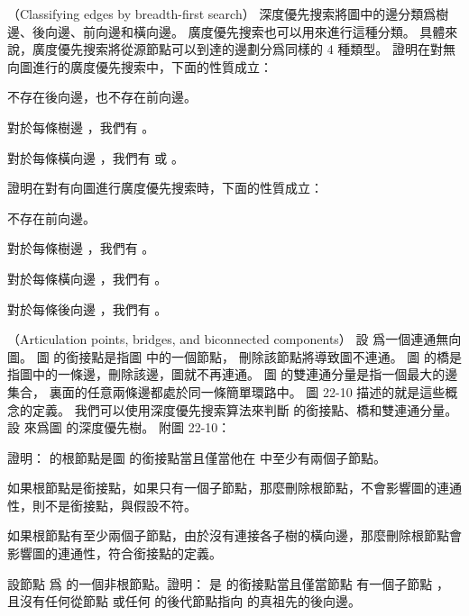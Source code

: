 \startsubject[
  title={Problems},
]

\startPROBLEM
（Classifying edges by breadth-first search）
深度優先搜索將圖中的邊分類爲樹邊、後向邊、前向邊和橫向邊。
廣度優先搜索也可以用來進行這種分類。
具體來說，廣度優先搜索將從源節點可以到達的邊劃分爲同樣的 4 種類型。
\startigBase[a]
\startitem
證明在對無向圖進行的廣度優先搜索中，下面的性質成立：
\startigBase[n]
\item 不存在後向邊，也不存在前向邊。
\item 對於每條樹邊 ，我們有 。
\item 對於每條橫向邊 ，我們有  或 。
\stopigBase
\stopitem

\startANSWER
{}
\stopANSWER

\startitem
證明在對有向圖進行廣度優先搜索時，下面的性質成立：
\startigBase[n]
\item 不存在前向邊。
\item 對於每條樹邊 ，我們有 。
\item 對於每條橫向邊 ，我們有 。
\item 對於每條後向邊 ，我們有 。
\stopigBase
\stopitem

\startANSWER
{}
\stopANSWER

\stopigBase
\stopPROBLEM

\startPROBLEM
（Articulation points, bridges, and biconnected components）
設  爲一個連通無向圖。
圖  的{\EMP 銜接點}是指圖  中的一個節點，
刪除該節點將導致圖不連通。
圖  的{\EMP 橋}是指圖中的一條邊，刪除該邊，圖就不再連通。
圖  的{\EMP 雙連通分量}是指一個最大的邊集合，
裏面的任意兩條邊都處於同一條簡單環路中。
圖 22-10 描述的就是這些概念的定義。
我們可以使用深度優先搜索算法來判斷  的銜接點、橋和雙連通分量。
設  來爲圖  的深度優先樹。
附圖 22-10：

\externalfigure[output/p22-2-1]

\startigBase[a]\startitem
證明：  的根節點是圖  的銜接點當且僅當他在  中至少有兩個子節點。
\stopitem\stopigBase

\startANSWER
如果根節點是銜接點，如果只有一個子節點，那麼刪除根節點，不會影響圖的連通性，則不是銜接點，與假設不符。

如果根節點有至少兩個子節點，由於沒有連接各子樹的橫向邊，那麼刪除根節點會影響圖的連通性，符合銜接點的定義。
\stopANSWER

\startigBase[continue]\startitem
設節點  爲  的一個非根節點。證明：
  是  的銜接點當且僅當節點  有一個子節點 ，
且沒有任何從節點  或任何  的後代節點指向  的真祖先的後向邊。
\stopitem\stopigBase

